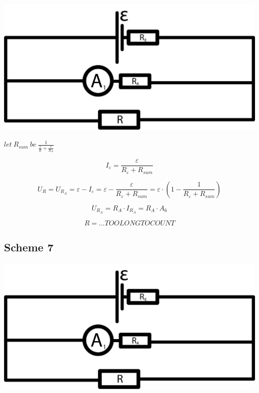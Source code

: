 \documentclass[11pt]{memoir}
\begin{document}
    \includegraphics[width=\linewidth]{../schemes/Scheme6.png}

    $let~ R_{sum} ~be~ \frac{1}{\frac{1}{R} + \frac{1}{R_A}}$

    \begin{equation*}
        I_{\varepsilon} = \frac{\varepsilon}{R_{\varepsilon} + R_{sum}}
    \end{equation*}

    \begin{equation*}
        U_R = U_{R_A} = \varepsilon - I_{\varepsilon} = \varepsilon - \frac{\varepsilon}{R_{\varepsilon} + R_{sum}}
        = \varepsilon \cdot \left( 1 - \frac{1}{R_{\varepsilon} + R_{sum}} \right)
    \end{equation*}

    \begin{equation*}
        U_{R_A} = R_A \cdot I_{R_A} = R_A \cdot A_6
    \end{equation*}

    \begin{equation}\label{eq:equation6}
        R = ... TOO LONG TO COUNT
    \end{equation}

    \newpage

    \subsection{Scheme 7}\label{subsec:scheme-7}
    \includegraphics[width=\linewidth]{../schemes/Scheme6.png}
\end{document}
